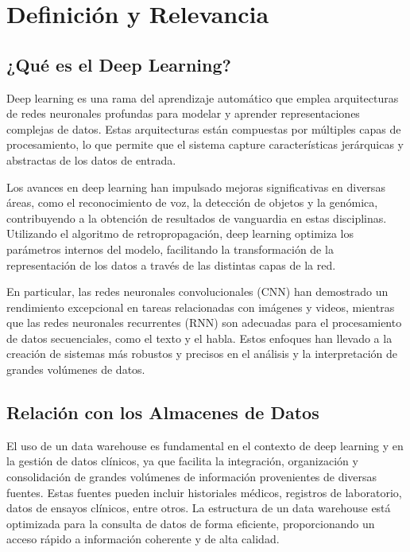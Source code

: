 \documentclass{article}
\begin{document}
\section{Definición y Relevancia}
\subsection{¿Qué es el Deep Learning?}

Deep learning es una rama del aprendizaje automático que emplea arquitecturas de redes neuronales profundas para modelar y aprender representaciones complejas de datos. Estas arquitecturas están compuestas por múltiples capas de procesamiento, lo que permite que el sistema capture características jerárquicas y abstractas de los datos de entrada. \cite{lecun2015deep}

Los avances en deep learning han impulsado mejoras significativas en diversas áreas, como el reconocimiento de voz, la detección de objetos y la genómica, contribuyendo a la obtención de resultados de vanguardia en estas disciplinas. Utilizando el algoritmo de retropropagación, deep learning optimiza los parámetros internos del modelo, facilitando la transformación de la representación de los datos a través de las distintas capas de la red.

En particular, las redes neuronales convolucionales (CNN) han demostrado un rendimiento excepcional en tareas relacionadas con imágenes y videos, mientras que las redes neuronales recurrentes (RNN) son adecuadas para el procesamiento de datos secuenciales, como el texto y el habla. Estos enfoques han llevado a la creación de sistemas más robustos y precisos en el análisis y la interpretación de grandes volúmenes de datos.
\cite{10.1145/3234150}


\subsection{Relación con los Almacenes de Datos}

El uso de un data warehouse es fundamental en el contexto de deep learning y en la gestión de datos clínicos, ya que facilita la integración, organización y consolidación de grandes volúmenes de información provenientes de diversas fuentes. Estas fuentes pueden incluir historiales médicos, registros de laboratorio, datos de ensayos clínicos, entre otros. La estructura de un data warehouse está optimizada para la consulta de datos de forma eficiente, proporcionando un acceso rápido a información coherente y de alta calidad.
\end{document}
